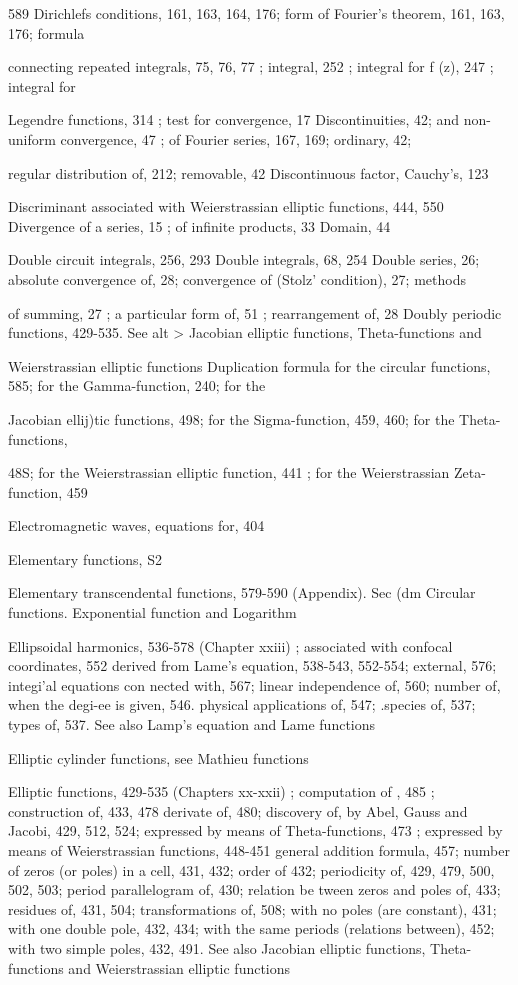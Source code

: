 589
Dirichlefs conditions, 161, 163, 164, 176; form of Fourier's theorem, 161, 163, 176; formula

connecting repeated integrals, 75, 76, 77 ; integral, 252 ; integral for f (z), 247 ; integral for

Legendre functions, 314 ; test for convergence, 17
Discontinuities, 42; and non-uniform convergence, 47 ; of Fourier series, 167, 169; ordinary, 42;

regular distribution of, 212; removable, 42
Discontinuous factor, Cauchy's, 123

Discriminant associated with Weierstrassian elliptic functions, 444, 550
Divergence of a series, 15 ; of infinite products, 33
Domain, 44

Double circuit integrals, 256, 293
Double integrals, 68, 254
Double series, 26; absolute convergence of, 28; convergence of (Stolz' condition), 27; methods

of summing, 27 ; a particular form of, 51 ; rearrangement of, 28
Doubly periodic functions, 429-535. See alt > Jacobian elliptic functions, Theta-functions and

Weierstrassian elliptic functions
Duplication formula for the circular functions, 585; for the Gamma-function, 240; for the

Jacobian ellij)tic functions, 498; for the Sigma-function, 459, 460; for the Theta-functions,

48S; for the Weierstrassian elliptic function, 441 ; for the Weierstrassian Zeta-function, 459

Electromagnetic waves, equations for, 404

Elementary functions, S2

Elementary transcendental functions, 579-590 (Appendix). Sec (dm Circular functions.
Exponential function and Logarithm

Ellipsoidal harmonics, 536-578 (Chapter xxiii) ; associated with confocal coordinates, 552
derived from Lame's equation, 538-543, 552-554; external, 576; integi'al equations con
nected with, 567; linear independence of, 560; number of, when the degi-ee is given, 546.
physical applications of, 547; .species of, 537; types of, 537. See also Lamp's equation
and Lame functions

Elliptic cylinder functions, see Mathieu functions

Elliptic functions, 429-535 (Chapters xx-xxii) ; computation of , 485 ; construction of, 433, 478
derivate of, 480; discovery of, by Abel, Gauss and Jacobi, 429, 512, 524; expressed by
means of Theta-functions, 473 ; expressed by means of Weierstrassian functions, 448-451
general addition formula, 457; number of zeros (or poles) in a cell, 431, 432; order of
432; periodicity of, 429, 479, 500, 502, 503; period parallelogram of, 430; relation be
tween zeros and poles of, 433; residues of, 431, 504; transformations of, 508; with no
poles (are constant), 431; with one double pole, 432, 434; with the same periods (relations
between), 452; with two simple poles, 432, 491. See also Jacobian elliptic functions,
Theta-functions and Weierstrassian elliptic functions


